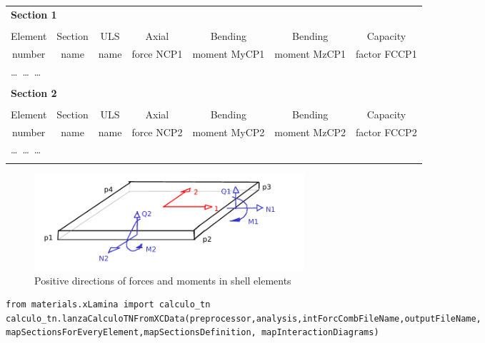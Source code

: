 \begin{center}
\begin{tabular}{ccccccc}
\multicolumn{7}{l}{\textbf{Section 1}} \\
\\
Element & Section & ULS & Axial & Bending & Bending & Capacity \\
number  & name & name & force NCP1 & moment MyCP1 & moment MzCP1 & factor FCCP1 \\
\hline
\multicolumn{7}{l}{\ldots\ \ldots\ \ldots} \\
\\
\multicolumn{7}{l}{\textbf{Section 2}} \\
\\
Element & Section & ULS & Axial & Bending & Bending & Capacity \\
number  & name & name & force NCP2 & moment MyCP2 & moment MzCP2 & factor FCCP2 \\
\hline
\multicolumn{7}{l}{\ldots\ \ldots\ \ldots} \\
\\

\end{tabular}
\end{center}

\begin{figure}[h]
\centering
\includegraphics[width=100mm]{materials/figures/signosEsfuerzos}
\caption{Positive directions of forces and moments in shell elements}\label{shell_forces_moments}
\end{figure}

 
\begin{verbatim}
from materials.xLamina import calculo_tn
calculo_tn.lanzaCalculoTNFromXCData(preprocessor,analysis,intForcCombFileName,outputFileName, 
mapSectionsForEveryElement,mapSectionsDefinition, mapInteractionDiagrams)
\end{verbatim}
\begin{paramFuncTable}
\preprocessor{} \\
\analysis{} \\
\\
\outputFileName{}\\
\mapSectionsForEveryElement{} \\
\mapSectionsDefinition{} \\
\mapInteractionDiagrams{} \\
\end{paramFuncTable}


